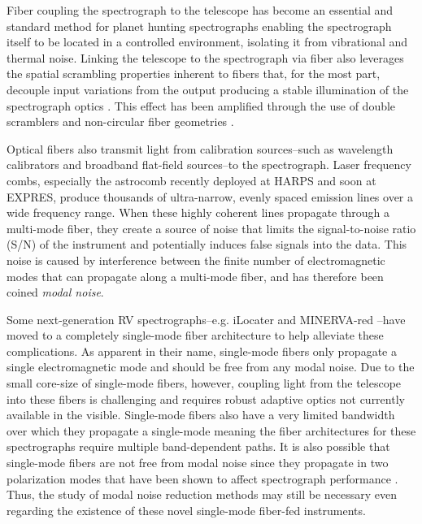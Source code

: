 \documentclass[twocolumn]{emulateapj}
\begin{document}
Fiber coupling the spectrograph to the telescope has become an essential and standard method for planet hunting spectrographs enabling the spectrograph itself to be located in a controlled environment, isolating it from vibrational and thermal noise. Linking the telescope to the spectrograph via fiber also leverages the spatial scrambling properties inherent to fibers that, for the most part, decouple input variations from the output producing a stable illumination of the spectrograph optics \citep{Hunter1992}. This effect has been amplified through the use of double scramblers \citep{Halverson2015a, Spronck2015} and non-circular fiber geometries \citep{Chazelas2010, Spronck2012, Plavchan2013}.

Optical fibers also transmit light from calibration sources--such as wavelength calibrators and broadband flat-field sources--to the spectrograph. Laser frequency combs, especially the  astrocomb \citep{Probst2014} recently deployed at HARPS and soon at EXPRES, produce thousands of ultra-narrow, evenly spaced emission lines over a wide frequency range. When these highly coherent lines propagate through a multi-mode fiber, they create a source of noise that limits the signal-to-noise ratio (S/N) of the instrument and potentially induces false signals into the data. This noise is caused by interference between the finite number of electromagnetic modes that can propagate along a multi-mode fiber, and has therefore been coined \textit{modal noise}.

Some next-generation RV spectrographs--e.g. iLocater \citep{Crepp2016} and MINERVA-red \citep{Blake2015}--have moved to a completely single-mode fiber architecture to help alleviate these complications. As apparent in their name, single-mode fibers only propagate a single electromagnetic mode and should be free from any modal noise. Due to the small core-size of single-mode fibers, however, coupling light from the telescope into these fibers is challenging and requires robust adaptive optics not currently available in the visible. Single-mode fibers also have a very limited bandwidth over which they propagate a single-mode meaning the fiber architectures for these spectrographs require multiple band-dependent paths. It is also possible that single-mode fibers are not free from modal noise since they propagate in two polarization modes that have been shown to affect spectrograph performance \citet{Halverson2015b}. Thus, the study of modal noise reduction methods may still be necessary even regarding the existence of these novel single-mode fiber-fed instruments.
\end{document}
